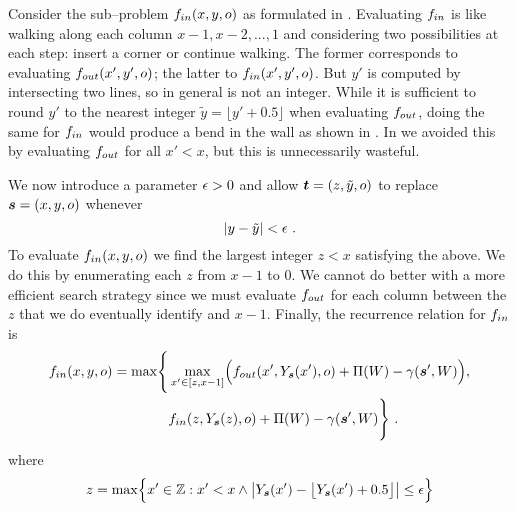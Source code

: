 Consider the sub--problem $\SubProbIN(x,y,\WallOrient)$ as formulated
in . Evaluating $\SubProbIN$ is like
walking along each column $x-1,x-2,...,1$ and considering two
possibilities at each step: insert a corner or continue walking. The
former corresponds to evaluating $\SubProbOUT(x',y',\WallOrient)$; the
latter to $\SubProbIN(x',y',\WallOrient)$. But $y'$ is computed by
intersecting two lines, so in general is not an integer. While it
is sufficient to round $y'$ to the nearest integer $\tilde{y}=\lfloor
y'+0.5 \rfloor$ when evaluating $\SubProbOUT$, doing the same for
$\SubProbIN$ would produce a bend in the wall as shown in
. In  we avoided this
by evaluating $\SubProbOUT$ for all $x'<x$, but this is unnecessarily
wasteful.

We now introduce a parameter $\RoundoffEps>0$ and allow
$\OtherState=(z,\tilde{y},\WallOrient)$ to replace
$\State=(x,y,\WallOrient)$ whenever
\begin{equation}
  |y-\tilde{y}| < \RoundoffEps ~.
  \label{eq:eps}
\end{equation}
To evaluate $\SubProbIN(x,y,\WallOrient)$ we find the largest integer
$z<x$ satisfying the above. We do this by enumerating  each $z$
from $x-1$ to $0$. We cannot do better with a more efficient search
strategy since we must evaluate $\SubProbOUT$ for each column between
the $z$ that we do eventually identify and $x-1$. Finally, the
recurrence relation for $\SubProbIN$ is
\begin{equation}
  \label{eq:fin-recurrence-final}
  \begin{split}
    \SubProbIN(x,y,\WallOrient) = 
    \max \Biggl\{&
      \max_{x'\in[z,x-1]}\limits \Bigl(
        \SubProbOUT(x',Y_{\State}(x'),\WallOrient) 
        + \ScenePayoff(\Wall) 
        - \CornerPenalty(\State', \Wall)
      \Bigr),\\
      & \SubProbIN(z, Y_{\State}(z), \WallOrient)
      + \ScenePayoff(\Wall) 
      - \CornerPenalty(\State', \Wall)
    \Biggr\} ~.
  \end{split}
\end{equation}
where
\begin{equation}
  z = \max \Bigl\{x'\in\Ints : x'<x \wedge
    \bigl|Y_{\State}(x') - \bigl\lfloor Y_{\State}(x') + 0.5 \bigr\rfloor\bigr|
    \leq \RoundoffEps \Bigr\}
\end{equation}

